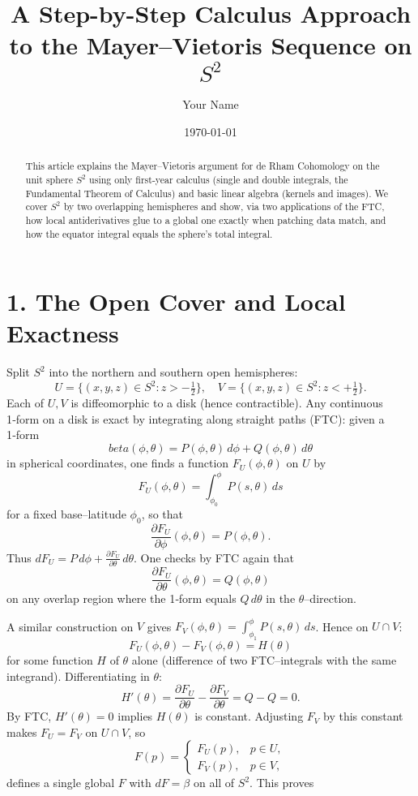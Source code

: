 \documentclass[11pt]{article}
\title{A Step-by-Step Calculus Approach to the Mayer–Vietoris Sequence on $S^2$}
\author{Your Name}
\date{\today}
\begin{document}
	\maketitle
	
	\begin{abstract}
		This article explains the Mayer–Vietoris argument for de Rham Cohomology on the unit sphere $S^2$ using only first-year calculus (single and double integrals, the Fundamental Theorem of Calculus) and basic linear algebra (kernels and images). We cover $S^2$ by two overlapping hemispheres and show, via two applications of the FTC, how local antiderivatives glue to a global one exactly when patching data match, and how the equator integral equals the sphere’s total integral.
	\end{abstract}
	
	\section{1. The Open Cover and Local Exactness}
	Split $S^2$ into the northern and southern open hemispheres:
	\[
	U = \{(x,y,z)\in S^2: z> -\tfrac12\},
	\quad
	V = \{(x,y,z)\in S^2: z< +\tfrac12\}.
	\]
	Each of $U,V$ is diffeomorphic to a disk (hence contractible).  Any continuous 1‑form on a disk is exact by integrating along straight paths (FTC): given a 1‑form
	\[
	beta(\phi,\theta) = P(\phi,\theta)\,d\phi + Q(\phi,\theta)\,d\theta
	\]
	in spherical coordinates, one finds a function $F_U(\phi,\theta)$ on $U$ by
	\[
	F_U(\phi,\theta) = \int_{\phi_0}^{\phi} P(s,\theta)\,ds
	\]
	for a fixed base–latitude $\phi_0$, so that
	\[
	\frac{\partial F_U}{\partial \phi}(\phi,\theta) = P(\phi,\theta).
	\]
	Thus $dF_U = P\,d\phi + \frac{\partial F_U}{\partial \theta}\,d\theta$.  One checks by FTC again that
	\[
	\frac{\partial F_U}{\partial \theta}(\phi,\theta) = Q(\phi,\theta)
	\]
	on any overlap region where the 1‑form equals $Q\,d\theta$ in the $\theta$–direction.
	
	A similar construction on $V$ gives $F_V(\phi,\theta)=\int_{\phi_1}^{\phi}P(s,\theta)\,ds$.  Hence on $U\cap V$:
	\[
	F_U(\phi,\theta) - F_V(\phi,\theta) = H(\theta)
	\]
	for some function $H$ of $\theta$ alone (difference of two FTC–integrals with the same integrand).  Differentiating in $\theta$:
	\[
	H'(\theta) = \frac{\partial F_U}{\partial \theta} - \frac{\partial F_V}{\partial \theta} = Q - Q = 0.
	\]
	By FTC, $H'(\theta)=0$ implies $H(\theta)$ is constant.  Adjusting $F_V$ by this constant makes $F_U=F_V$ on $U\cap V$, so
	\[
	F(p)=\begin{cases}F_U(p), & p\in U,\\ F_V(p), & p\in V,\end{cases}
	\]
	defines a single global $F$ with $dF=\beta$ on all of $S^2$.  This proves
	
\end{document}
